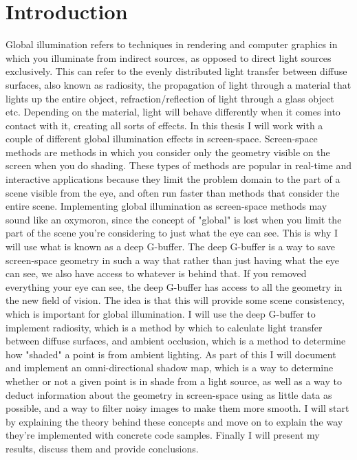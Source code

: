 \chapter{Introduction}
Global illumination refers to techniques in rendering and computer graphics in which you illuminate from indirect sources, as opposed to direct light sources exclusively. This can refer to the evenly distributed light transfer between diffuse surfaces, also known as radiosity, the propagation of light through a material that lights up the entire object, refraction/reflection of light through a glass object etc. Depending on the material, light will behave differently when it comes into contact with it, creating all sorts of effects. In this thesis I will work with a couple of different global illumination effects in screen-space. Screen-space methods are methods in which you consider only the geometry visible on the screen when you do shading. These types of methods are popular in real-time and interactive applications because they limit the problem domain to the part of a scene visible from the eye, and often run faster than methods that consider the entire scene. Implementing global illumination as screen-space methods may sound like an oxymoron, since the concept of "global" is lost when you limit the part of the scene you're considering to just what the eye can see. This is why I will use what is known as a deep G-buffer. The deep G-buffer is a way to save screen-space geometry in such a way that rather than just having what the eye can see, we also have access to whatever is behind that. If you removed everything your eye can see, the deep G-buffer has access to all the geometry in the new field of vision. The idea is that this will provide some scene consistency, which is important for global illumination. I will use the deep G-buffer to implement radiosity, which is a method by which to calculate light transfer between diffuse surfaces, and ambient occlusion, which is a method to determine how "shaded" a point is from ambient lighting. As part of this I will document and implement an omni-directional shadow map, which is a way to determine whether or not a given point is in shade from a light source, as well as a way to deduct information about the geometry in screen-space using as little data as possible, and a way to filter noisy images to make them more smooth. I will start by explaining the theory behind these concepts and move on to explain the way they're implemented with concrete code samples. Finally I will present my results, discuss them and provide conclusions.